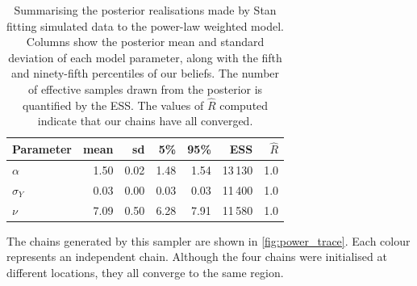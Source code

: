 \begin{table}[tbp]
  \begin{tabular}{@{}lrrrrrr@{}}
    \toprule
    Parameter    & mean & sd   & 5\%  & 95\% & ESS     & $\widehat{R}$ \\
    \midrule
    $\alpha$     & 1.50 & 0.02 & 1.48 & 1.54 & 13\,130 & 1.0           \\
    $\sigma_{Y}$ & 0.03 & 0.00 & 0.03 & 0.03 & 11\,400 & 1.0           \\
    $\nu$        & 7.09 & 0.50 & 6.28 & 7.91 & 11\,580 & 1.0           \\
    \bottomrule
  \end{tabular}
  \caption{Summarising the posterior realisations made by Stan fitting
    simulated data to the power-law weighted model. Columns show the
    posterior mean and standard deviation of each model parameter, along with
    the fifth and ninety-fifth percentiles of our beliefs. The number of
    effective samples drawn from the posterior is quantified by the ESS. The
    values of $\widehat{R}$ computed indicate that our chains have all
    converged.}
  \label{tab:power_summary}
\end{table}

The chains generated by this sampler are shown in \cref{fig:power_trace}. Each
colour represents an independent chain. Although the four chains were
initialised at different locations, they all converge to the same region.

